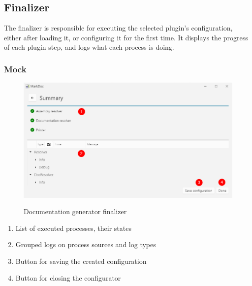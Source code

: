 \subsection{Finalizer}

The finalizer is responsible for executing the selected plugin's configuration, either after loading it, or configuring it for the first time. It displays the progress of each plugin step, and logs what each process is doing.

\subsubsection{Mock}

\begin{figure}[H]
    \includegraphics[width=\linewidth]{img/markDocFinalizer.png}
    \label{fig:finalizerPage}
    \caption{Documentation generator finalizer}
\end{figure}

\begin{enumerate}
    \item List of executed processes, their states
    \item Grouped logs on process sources and log types
    \item Button for saving the created configuration
    \item Button for closing the configurator
\end{enumerate}
